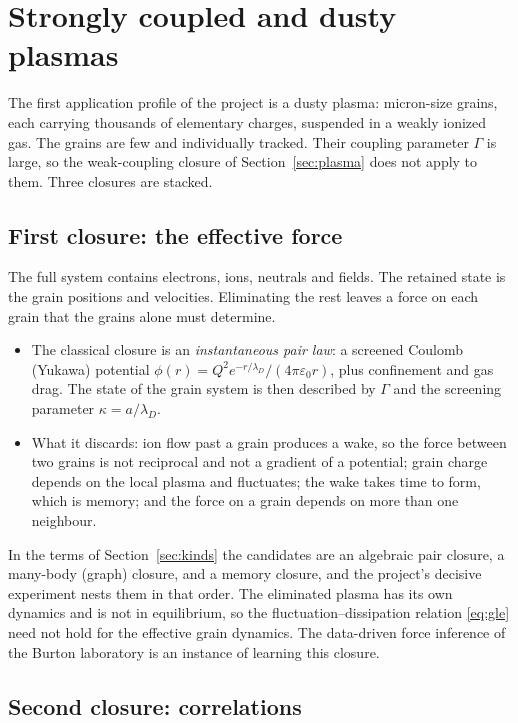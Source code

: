 \section{Strongly coupled and dusty plasmas}
\label{sec:strong}

The first application profile of the project is a dusty plasma: micron-size
grains, each carrying thousands of elementary charges, suspended in a weakly
ionized gas. The grains are few and individually tracked. Their coupling
parameter $\Gamma$ is large, so the weak-coupling closure of
Section~\ref{sec:plasma} does not apply to them. Three closures are
stacked.

\subsection{First closure: the effective force}

The full system contains electrons, ions, neutrals and fields. The
retained state is the grain positions and velocities. Eliminating the rest
leaves a force on each grain that the grains alone must determine.
\begin{itemize}
  \item The classical closure is an \emph{instantaneous pair law}: a
    screened Coulomb (Yukawa) potential
    $\phi(r)=Q^2e^{-r/\lambda_D}/(4\pi\varepsilon_0r)$, plus confinement
    and gas drag. The state of the grain system is then described by
    $\Gamma$ and the screening parameter $\kappa=a/\lambda_D$.
  \item What it discards: ion flow past a grain produces a wake, so the
    force between two grains is not reciprocal and not a gradient of a
    potential; grain charge depends on the local plasma and fluctuates; the
    wake takes time to form, which is memory; and the force on a grain
    depends on more than one neighbour.
\end{itemize}
In the terms of Section~\ref{sec:kinds} the candidates are an algebraic
pair closure, a many-body (graph) closure, and a memory closure, and the
project's decisive experiment nests them in that order. The eliminated
plasma has its own dynamics and is not in equilibrium, so the
fluctuation--dissipation relation \eqref{eq:gle} need not hold for the
effective grain dynamics. The data-driven force inference of the Burton
laboratory \cite{Yu25} is an instance of learning this closure.

\subsection{Second closure: correlations}

